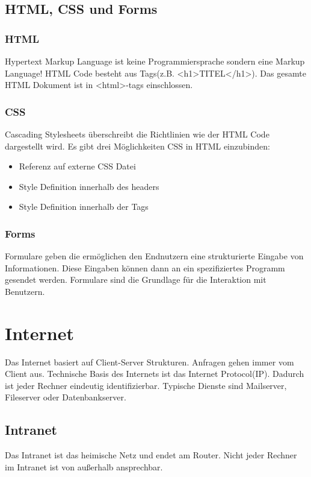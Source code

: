 \documentclass[12pt,a4paper]{article}
\begin{document}
\subsection{HTML, CSS und Forms}
\subsubsection{HTML}
Hypertext Markup Language ist keine Programmiersprache sondern eine Markup Language! HTML Code besteht aus Tags(z.B. <h1>TITEL</h1>). Das gesamte HTML Dokument ist in <html>-tags einschlossen.

\subsubsection{CSS}
Cascading Stylesheets überschreibt die Richtlinien wie der HTML Code dargestellt wird. Es gibt drei Möglichkeiten CSS in HTML einzubinden:
\begin{itemize}
	\item Referenz auf externe CSS Datei 
	\item Style Definition innerhalb des headers
	\item Style Definition innerhalb der Tags
\end{itemize}

\subsubsection{Forms}
Formulare geben die ermöglichen den Endnutzern eine strukturierte Eingabe von Informationen. Diese Eingaben können dann an ein spezifiziertes Programm gesendet werden. Formulare sind die Grundlage für die Interaktion mit Benutzern.

\section{Internet}
Das Internet basiert auf Client-Server Strukturen. Anfragen gehen immer vom Client aus. Technische Basis des Internets ist das Internet Protocol(IP). Dadurch ist jeder Rechner eindeutig identifizierbar. Typische Dienste sind Mailserver, Fileserver oder Datenbankserver. 

\subsection{Intranet}
Das Intranet ist das heimische Netz und endet am Router. Nicht jeder Rechner im Intranet ist von außerhalb ansprechbar.
\end{document}
